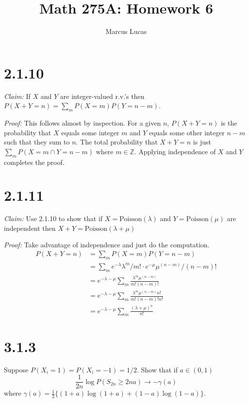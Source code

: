 \documentclass[10pt]{article}
\title{Math 275A: Homework 6}
\author{Marcus Lucas}
\date{\vspace{-1cm}}
\begin{document}
\maketitle

\section*{2.1.10}
\textit{Claim:}
If $X$ and $Y$ are integer-valued r.v.'s then
$P(X+Y=n) = \sum_m P(X=m) P(Y=n-m)$.

\textit{Proof:}
This follows almost by inspection. For a given $n$,
$P(X+Y=n)$ is the probability that $X$ equals
some integer $m$ and $Y$ equals some other 
integer $n-m$ such that they sum to $n$.
The total probability that $X+Y=n$ is just
$\sum_m P(X=m \cap Y=n-m)$ where $m \in \mathbb{Z}$.
Applying independence of $X$ and $Y$ completes the proof.

\section*{2.1.11}
\textit{Claim:}
Use 2.1.10 to show that if $X = \text{Poisson}(\lambda)$
and $Y = \text{Poisson}(\mu)$ are independent then 
$X+Y=\text{Poisson} (\lambda + \mu)$

\textit{Proof:}
Take advantage of independence and 
just do the computation.
\begin{equation*}
\begin{aligned}
  P(X+Y = n) &= \sum_m P(X=m)P(Y=n-m) \\
  &= \sum_m e^{-\lambda} \lambda^m / m! \cdot e^{-\mu} \mu^{(n-m)} / (n-m)! \\
  &= e^{-\lambda - \mu} \sum_m \frac{\lambda^m \mu^{(n-m)}}{m!(n-m)!} \\
  &= e^{-\lambda - \mu} \sum_m \frac{\lambda^m \mu^{(n-m)}n!}{m!(n-m)!n!} \\
  &= e^{-\lambda - \mu} \sum_m \frac{(\lambda + \mu)^n}{n!}
\end{aligned}
\end{equation*}

\section*{3.1.3}
Suppose $P(X_i=1)=P(X_i=-1)=1/2$. Show that if $a \in (0,1)$
\begin{equation*}
  \frac{1}{2n} \log P(S_{2n} \ge 2na) \to -\gamma(a)
\end{equation*}
where $\gamma(a) = \frac{1}{2}\{(1+a)\log(1+a)+(1-a)\log(1-a)\}$.
\end{document}
